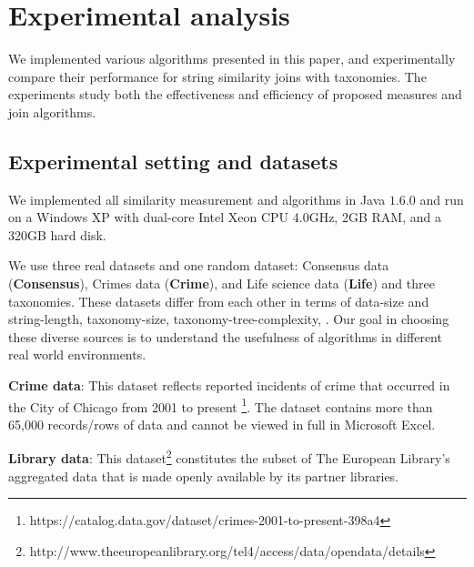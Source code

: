 \section{Experimental analysis}

We implemented various algorithms presented in this paper, and experimentally compare their performance for string similarity joins with taxonomies. The experiments study both the effectiveness and efficiency of proposed measures and join algorithms.  


 

\subsection{Experimental setting and datasets}

We  implemented all similarity measurement and algorithms in Java $1.6.0$ and run on a
Windows XP with dual-core Intel Xeon CPU 4.0GHz, 2GB RAM, and a 320GB hard disk.


We use three real datasets and one random dataset: Consensus data (\textbf{Consensus}),
Crimes data  (\textbf{Crime}), and Life science data
(\textbf{Life}) and three taxonomies. These datasets differ from each other in terms of data-size and string-length, taxonomy-size, taxonomy-tree-complexity, . Our goal in choosing these diverse sources is to understand the usefulness of algorithms in different real world environments.


\smallskip

\noindent \textbf{{Crime data}}: This dataset reflects reported incidents of crime that occurred in the City of Chicago from 2001 to present \footnote{https://catalog.data.gov/dataset/crimes-2001-to-present-398a4}. The dataset contains more than 65,000 records/rows of data and cannot be viewed in full in Microsoft Excel.


\noindent \textbf{{Library data}}: This dataset\footnote{http://www.theeuropeanlibrary.org/tel4/access/data/opendata/details}  constitutes the subset of The European Library's aggregated data that is made openly available by its partner libraries. 




